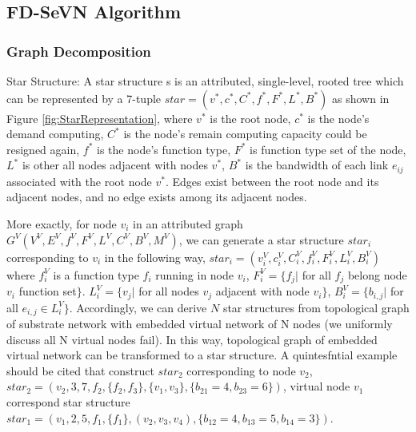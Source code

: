 \subsection{FD-SeVN Algorithm}
\subsubsection{Graph Decomposition}
Star Structure: A star structure s is an attributed, single-level, rooted tree which can be represented by a 7-tuple $star=(v^*,c^*,C^*,f^*,F^*,L^*,B^*)$ as shown in Figure \ref{fig:StarRepresentation}, where $v^*$ is the root node, $c^*$ is the  node's demand computing, $C^*$ is the node's remain computing capacity could be resigned again, $f^*$ is the node's function type, $F^*$ is function type set of the node, $L^*$ is other all nodes  adjacent with nodes $v^*$, $B^*$ is the bandwidth of each link $e_{ij}$ associated with the root node $v^*$. Edges exist between the root node and its adjacent nodes, and no edge exists among its adjacent nodes.

More exactly, for node $v_i$ in an attributed graph  $G^V (V^V,E^V,f^V,F^V,L^V,C^V,B^V,M^V)$, we can generate a star structure $star_i$ corresponding to $v_i$ in the following way, $star_i=(v^V_i,c^V_i,C^V_i,f^V_i,F^V_i,L^V_i,B^V_i)$ where $f^V_i$ is a function type $f_i$ running in node $v_i$, $F^V_i=\{f_{j}|$ for all $f_j$ belong node $v_i$ function set$\}$.  $L^V_i=\{v_j|$ for all nodes $v_j$  adjacent with node $v_i\}$, $B^V_i=\{b_{i,j}| $ for all $e_{i,j}\in L^V_i\}$. Accordingly, we can derive $N$ star structures from topological graph of substrate network with embedded virtual network of N nodes (we uniformly discuss all N virtual nodes fail). In this way, topological graph of embedded virtual network can be transformed to a  star structure. A quintesfntial example should be cited that construct $star_2$ corresponding to node $v_2$, $star_2=(v_2,3,7,f_2,\{f_2,f_3\},\{v_1,v_3\},\{b_{21}=4,b_{23}=6\})$, virtual node $v_1$ correspond star structure $star_1=(v_1,2,5,f_1,\{f_1\},(v_2,v_3,v_4),\{b_{12}=4,b_{13}=5,b_{14}=3\})$.





